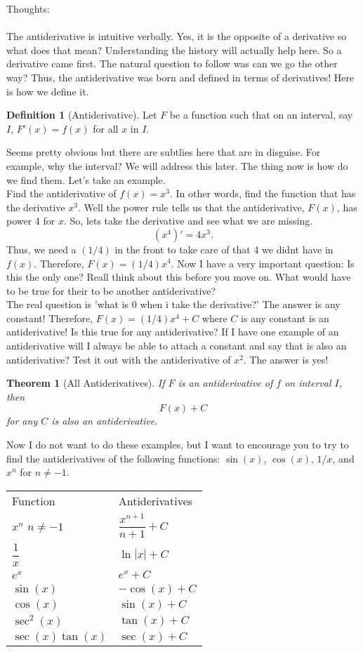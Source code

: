 \documentclass[10pt]{article}
\theoremstyle{Theorem}
\newtheorem{theorem}{Theorem}[section]
\theoremstyle{definition}
\newtheorem{definition}{Definition}[section]
\theoremstyle{remark}
\theoremstyle{custom}
\begin{document}
\thispagestyle{firststyle}
\pagestyle{plain}

Thoughts:\\\\
The antiderivative is intuitive verbally. Yes, it is the opposite of a derivative so what does that mean? Understanding the history will actually help here. So a derivative came first. The natural question to follow was can we go the other way? Thus, the antiderivative was born and defined in terms of derivatives! Here is how we define it.
\begin{definition}[Antiderivative]
Let $F$ be a function such that on an interval, say $I$, $F'(x)=f(x)$ for all $x$ in $I$.
\end{definition}
Seems pretty obvious but there are subtlies here that are in disguise. For example, why the interval? We will address this later. The thing now is how do we find them. Let's take an example.\\
Find the antiderivative of $f(x)=x^3$. In other words, find the function that has the derivative $x^3$. Well the power rule tells us that the antiderivative, $F(x)$, has power 4 for $x$. So, lets take the derivative and see what we are missing.
\[
(x^4)'=4x^3.
\]
Thus, we need a $(1/4)$ in the front to take care of that 4 we didnt have in $f(x)$. Therefore, $F(x)=(1/4)x^4$. Now I have a very important question: Is this the only one? Reall think about this before you move on. What would have to be true for their to be another antiderivative?\\
The real question is 'what is 0 when i take the derivative?' The answer is any constant! Therefore, $F(x)=(1/4)x^4+C$ where $C$ is any constant is an antiderivative! Is this true for any antiderivative? If I have one example of an antiderivative will I always be able to attach a constant and say that is also an antiderivative? Test it out with the antiderivative of $x^2$. The answer is yes!
\begin{theorem}[All Antiderivatives]
If $F$ is an antiderivative of $f$ on interval $I$, then 
\[
F(x)+C
\]
for any $C$ is also an antiderivative.
\end{theorem}
Now I do not want to do these examples, but I want to encourage you to try to find the antiderivatives of the following functions: $\sin(x)$, $\cos(x)$, $1/x$, and $x^n$ for $n\neq -1$.
\newpage
\begin{center}
\begin{tabular}{ | m{6em} | m{6em}|} 
\hline
Function & Antiderivatives\\
$x^n$ $n\neq -1$ & $\dfrac{x^{n+1}}{n+1}+C$\\
\hline
$\dfrac{1}{x}$ & $\ln|x|+C$\\
\hline
$e^x$ & $e^x+C$\\
\hline
$\sin(x)$ & $-\cos(x)+C$\\
\hline
$\cos(x)$ & $\sin(x)+C$\\
\hline
$\sec^2(x)$ & $\tan(x)+C$\\
\hline
$\sec(x)\tan(x)$ & $\sec(x)+C$\\
\hline
\end{tabular}
\end{center}
\end{document}
